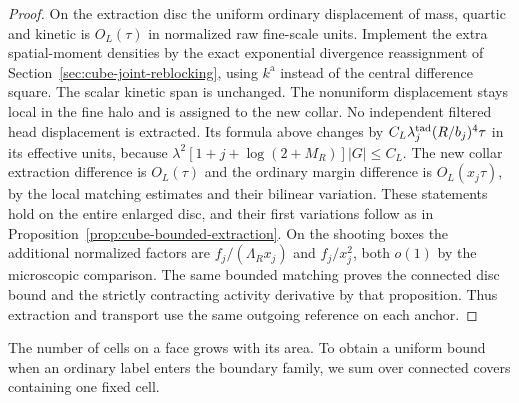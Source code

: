 \documentclass[11pt]{article}
\theoremstyle{definition}
\begin{document}
\begin{proof}
On the extraction disc the uniform ordinary displacement
of mass, quartic and kinetic is \(O_L(\tau)\) in normalized
raw fine-scale units. Implement the extra spatial-moment
densities by the exact exponential divergence reassignment
of Section~\ref{sec:cube-joint-reblocking}, using
\(k^{\mathrm a}\) instead of the central difference
square. The scalar kinetic span is unchanged. The
nonuniform displacement stays local in the fine halo
and is assigned to the new collar. No independent
filtered head displacement is extracted. Its formula
above changes by \(C_L\lambda^{\rm tad}_j(R/b_j)^4\tau\)
in its effective units, because
\(\lambda^2[1+j+\log(2+M_R)]|G|\le C_L\).
The new collar extraction difference is \(O_L(\tau)\)
and the ordinary margin difference is \(O_L(x_j\tau)\),
by the local matching estimates and their bilinear
variation. These statements hold on the entire enlarged
disc, and their first variations follow as in
Proposition~\ref{prop:cube-bounded-extraction}. On the
shooting boxes the additional normalized factors are
\(f_j/(\Lambda_R x_j)\) and \(f_j/x_j^2\), both \(o(1)\)
by the microscopic comparison. The same bounded matching
proves the connected disc bound and the strictly
contracting activity derivative by that proposition.
Thus extraction and transport use the same outgoing reference on
each anchor.
\end{proof}

The number of cells on a face grows with its area. To obtain a
uniform bound when an ordinary label enters the boundary family,
we sum over connected covers containing one fixed cell.
\end{document}
